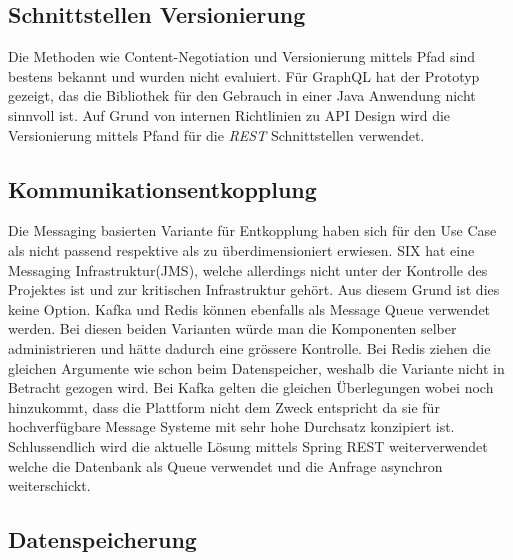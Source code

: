 \subsection{Schnittstellen Versionierung}

Die Methoden wie Content-Negotiation und Versionierung mittels Pfad sind bestens bekannt und wurden nicht evaluiert. Für GraphQL hat der Prototyp gezeigt, das die Bibliothek für den Gebrauch in einer Java Anwendung nicht sinnvoll ist.  Auf Grund von internen Richtlinien zu API Design wird die Versionierung mittels Pfand für die \textit{\gls{REST}} Schnittstellen verwendet.

\subsection{Kommunikationsentkopplung}

Die Messaging basierten Variante für Entkopplung haben sich für den Use Case als nicht passend respektive als zu überdimensioniert erwiesen. SIX hat eine Messaging Infrastruktur(JMS), welche allerdings nicht unter der Kontrolle des Projektes ist und zur kritischen Infrastruktur gehört. Aus diesem Grund ist dies keine Option. Kafka und Redis können ebenfalls als Message Queue verwendet werden. Bei diesen beiden Varianten würde man die Komponenten selber administrieren und hätte dadurch eine grössere Kontrolle. Bei Redis ziehen die gleichen Argumente wie schon beim Datenspeicher, weshalb die Variante nicht in Betracht gezogen wird. Bei Kafka gelten die gleichen Überlegungen wobei noch hinzukommt, dass die Plattform nicht dem Zweck entspricht da sie für hochverfügbare Message Systeme mit sehr hohe Durchsatz konzipiert ist.\newline
Schlussendlich wird die aktuelle Lösung mittels Spring REST weiterverwendet welche die Datenbank als Queue verwendet und die Anfrage asynchron weiterschickt. 

\subsection{Datenspeicherung}

